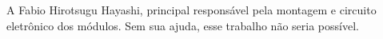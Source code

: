 A Fabio Hirotsugu Hayashi, principal responsável pela montagem e circuito eletrônico dos módulos. Sem sua ajuda, esse trabalho não seria possível.
